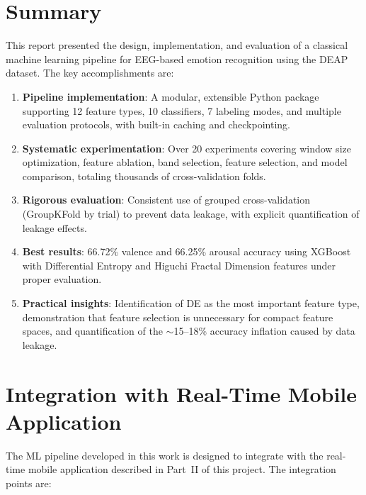 \documentclass[12pt,a4paper]{report}
\begin{document}
\section{Summary}

This report presented the design, implementation, and evaluation of a classical
machine learning pipeline for EEG-based emotion recognition using the DEAP
dataset. The key accomplishments are:

\begin{enumerate}
    \item \textbf{Pipeline implementation}: A modular, extensible Python package
          supporting 12 feature types, 10 classifiers, 7 labeling modes, and
          multiple evaluation protocols, with built-in caching and checkpointing.

    \item \textbf{Systematic experimentation}: Over 20 experiments covering
          window size optimization, feature ablation, band selection, feature
          selection, and model comparison, totaling thousands of
          cross-validation folds.

    \item \textbf{Rigorous evaluation}: Consistent use of grouped
          cross-validation (GroupKFold by trial) to prevent data leakage,
          with explicit quantification of leakage effects.

    \item \textbf{Best results}: 66.72\% valence and 66.25\% arousal accuracy
          using XGBoost with Differential Entropy and Higuchi Fractal Dimension
          features under proper evaluation.

    \item \textbf{Practical insights}: Identification of DE as the most
          important feature type, demonstration that feature selection is
          unnecessary for compact feature spaces, and quantification of the
          $\sim$15--18\% accuracy inflation caused by data leakage.
\end{enumerate}


\section{Integration with Real-Time Mobile Application}

The ML pipeline developed in this work is designed to integrate with the
real-time mobile application described in Part~II of this project. The
integration points are:
\end{document}
